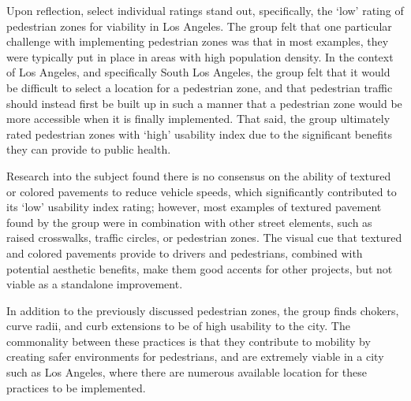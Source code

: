 Upon reflection, select individual ratings stand out, specifically, the `low' rating of pedestrian zones for viability in Los Angeles. The group felt that one particular challenge with implementing pedestrian zones was that in most examples, they were typically put in place in areas with high population density. In the context of Los Angeles, and specifically South Los Angeles, the group felt that it would be difficult to select a location for a pedestrian zone, and that pedestrian traffic should instead first be built up in such a manner that a pedestrian zone would be more accessible when it is finally implemented. That said, the group ultimately rated pedestrian zones with `high' usability index due to the significant benefits they can provide to public health.

Research into the subject found there is no consensus on the ability of textured or colored pavements to reduce vehicle speeds, which significantly contributed to its `low' usability index rating; however, most examples of textured pavement found by the group were in combination with other street elements, such as raised crosswalks, traffic circles, or pedestrian zones. The visual cue that textured and colored pavements provide to drivers and pedestrians, combined with potential aesthetic benefits, make them good accents for other projects, but not viable as a standalone improvement. 

In addition to the previously discussed pedestrian zones, the group finds chokers, curve radii, and curb extensions to be of high usability to the city. The commonality between these practices is that they contribute to mobility by creating safer environments for pedestrians, and are extremely viable in a city such as Los Angeles, where there are numerous available location for these practices to be implemented.